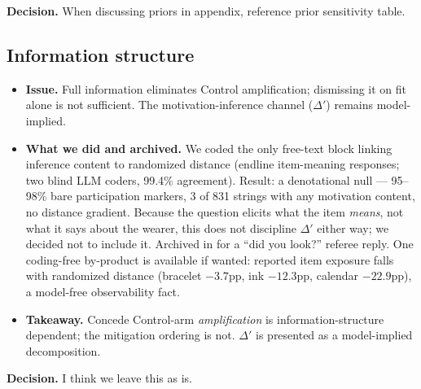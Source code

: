 \documentclass[11pt]{article}
\providecommand{\StructuralRobustnessPath}{appendix/structural-robustness}
\providecommand{\StructuralRobustnessPath}{../appendix/structural-robustness}
\newenvironment{decision}
  {\par\medskip\noindent\begin{minipage}{\linewidth}\color{blue!50!black}\textbf{Decision.} }
  {\end{minipage}\par\medskip}
\begin{document}
\begin{table}[htbp]
  \centering
  \scriptsize
  \caption{Prior sensitivity of the finite 0--2.5km multiplier, 13 specifications
    (\texttt{sections/multiplier-prior-sensitivity.tex})}
  \label{tab:memo-prior-grid}
\end{table}

\begin{decision}
  When discussing priors in appendix, reference prior sensitivity table.
\end{decision}

\FloatBarrier
\subsection{Information structure}
\begin{itemize}[nosep]
  \item \textbf{Issue.} Full information eliminates Control amplification; dismissing it
    on fit alone is not sufficient. The motivation-inference channel ($\Delta'$) remains
    model-implied.
  \item \textbf{What we did and archived.} We coded the only free-text block linking
    inference content to randomized distance (endline item-meaning responses; two blind
    LLM coders, 99.4\% agreement). Result: a denotational null --- 95--98\% bare
    participation markers, 3 of 831 strings with any motivation content, no distance
    gradient. Because the question elicits what the item \emph{means}, not what it says
    about the wearer, this does not discipline $\Delta'$ either way; we decided not to
    include it. Archived in  for a ``did you
    look?'' referee reply. One coding-free by-product is available if wanted: reported
    item exposure falls with randomized distance (bracelet $-3.7$pp, ink $-12.3$pp,
    calendar $-22.9$pp), a model-free observability fact.
  \item \textbf{Takeaway.} Concede Control-arm \emph{amplification} is
    information-structure dependent; the mitigation ordering is not. $\Delta'$ is
    presented as a model-implied decomposition.
\end{itemize}

\begin{decision}
  I think we leave this as is.
\end{decision}

\FloatBarrier
\end{document}

